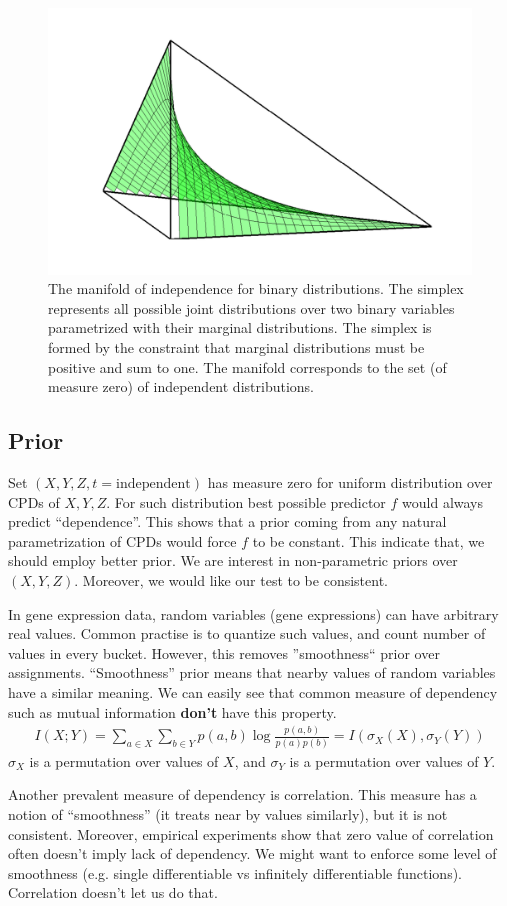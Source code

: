 \documentclass{article} %
\begin{document}
\begin{figure}[h]
\centering
\includegraphics[width=0.35\linewidth]{img/independence_surface-eps-converted-to-crop.pdf}
\caption{The manifold of independence for binary distributions. The simplex represents all possible joint distributions over two binary variables parametrized with their marginal distributions. The simplex is formed by the constraint that marginal distributions must be positive and sum to one.  The manifold corresponds to the set (of measure zero) of independent distributions.}
\label{fig:ind}
\end{figure}

\subsection{Prior}\label{sec:prior}
Set $(X, Y, Z, t=\text{independent})$ has measure zero for uniform
distribution over CPDs of $X, Y, Z$. For such distribution
best possible predictor $f$ would always predict ``dependence''. 
This shows that a prior coming from any natural parametrization
of CPDs would force $f$ to be constant. This indicate that, we should
employ better prior. We are interest in non-parametric priors over $(X, Y, Z)$.
Moreover, we would like our test to be consistent.


In gene expression data, random variables (gene expressions) can 
have arbitrary real values. Common practise is to quantize such values,
and count number of values in every bucket. However, this removes 
''smoothness`` prior over assignments. ``Smoothness'' prior means that
nearby values of random variables have a similar meaning. We can easily see
that common measure of dependency such as mutual information {\bf don't} have 
this property. 
\begin{align*}
  I(X;Y)=\sum_{a \in X}\sum_{b \in Y} p(a, b)\log{\frac{p(a, b)}{p(a)p(b)}}=I(\sigma_X(X), \sigma_Y(Y))
\end{align*}
$\sigma_X$ is a permutation over values of $X$, and $\sigma_Y$ is
a permutation over values of $Y$.


Another prevalent measure of dependency is correlation. This measure
has a notion of ``smoothness'' (it treats near by values similarly), but
it is not consistent. Moreover, empirical experiments show that zero value
of correlation often doesn't imply lack of dependency. We might want to 
enforce some level of smoothness (e.g. single differentiable vs infinitely 
differentiable functions). Correlation doesn't let us do that. 
\end{document}
